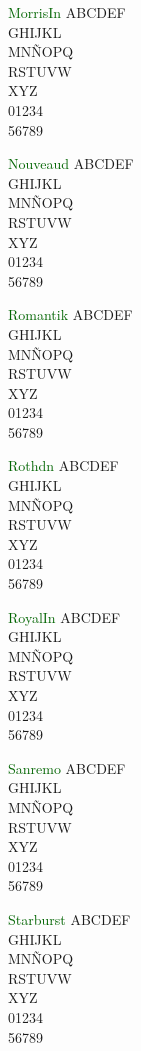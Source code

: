 \documentclass[11pt]{article}
\newcommand{\blInitSz}{20}
\begin{document}
\textcolor{darkgreen}{MorrisIn}
{\blSetMorrisIn\fontsize{\blInitSz}{40}\selectfont ABCDEF\\ GHIJKL\\ MNÑOPQ\\ RSTUVW\\ XYZ\\ 01234\\ 56789}

\textcolor{darkgreen}{Nouveaud}
{\blSetNouveaud\fontsize{\blInitSz}{40}\selectfont ABCDEF\\ GHIJKL\\ MNÑOPQ\\ RSTUVW\\ XYZ\\ 01234\\ 56789}

\textcolor{darkgreen}{Romantik}
{\blSetRomantik\fontsize{\blInitSz}{40}\selectfont ABCDEF\\ GHIJKL\\ MNÑOPQ\\ RSTUVW\\ XYZ\\ 01234\\ 56789}

\textcolor{darkgreen}{Rothdn}
{\blSetRothdn\fontsize{\blInitSz}{40}\selectfont ABCDEF\\ GHIJKL\\ MNÑOPQ\\ RSTUVW\\ XYZ\\ 01234\\ 56789}

\textcolor{darkgreen}{RoyalIn}
{\blSetRoyalIn\fontsize{\blInitSz}{40}\selectfont ABCDEF\\ GHIJKL\\ MNÑOPQ\\ RSTUVW\\ XYZ\\ 01234\\ 56789}

\textcolor{darkgreen}{Sanremo}
{\blSetSanremo\fontsize{\blInitSz}{40}\selectfont ABCDEF\\ GHIJKL\\ MNÑOPQ\\ RSTUVW\\ XYZ\\ 01234\\ 56789}

\textcolor{darkgreen}{Starburst}
{\blSetStarburst\fontsize{\blInitSz}{40}\selectfont ABCDEF\\ GHIJKL\\ MNÑOPQ\\ RSTUVW\\ XYZ\\ 01234\\ 56789}
\end{document}
